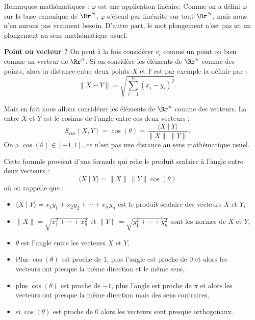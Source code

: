 \documentclass[11pt,class=report,crop=false]{standalone}
\begin{document}
Remarques mathématiques :
$\varphi$ est une application linéaire. Comme on a défini $\varphi$ sur la base canonique de $\Rr^N$, $\varphi$ s'étend par linéarité sur tout $\Rr^N$, mais nous n'en aurons pas vraiment besoin. D'autre part, le mot plongement n'est pas ici un plongement au sens mathématique usuel.

\medskip

\textbf{Point ou vecteur ?} 
On peut à la fois considérer $v_i$ comme un point ou bien comme un vecteur de $\Rr^n$.
Si on considère les éléments de $\Rr^n$ comme des points, alors 
la distance entre deux points $X$ et $Y$ est par exemple la  définie par :
$$\| X-Y \| = \sqrt{\sum_{i=1}^n (x_i - y_i)^2}.$$


Mais en fait nous allons considérer les éléments de $\Rr^n$ comme des vecteurs.
La  entre $X$ et $Y$ est le cosinus de l'angle entre ces deux vecteurs :
$$S_{\cos}(X,Y) = \cos(\theta) = \frac{\langle X \mid Y \rangle}{\| X \| \; \| Y\| }.$$
On a $\cos (\theta) \in [-1,1]$, ce n'est pas une distance au sens mathématique usuel.

Cette formule provient d'une formule qui relie le produit scalaire à l'angle entre deux vecteurs :
$$\langle X \mid Y \rangle  = \| X \| \ \| Y \| \cos(\theta)$$
où on rappelle que :
\begin{itemize}
	\item $\langle X \mid Y \rangle  = x_1y_1+x_2y_2+\cdots +x_ny_n$ est le produit scalaire des vecteurs $X$ et $Y$,
	\item $\| X \| = \sqrt{x_1^2+\cdots+x_n^2}$ et $\| Y \| = \sqrt{y_1^2+\cdots+y_n^2}$ sont les normes de $X$ et $Y$,
	\item $\theta$ est l'angle entre les vecteurs $X$ et $Y$.
\end{itemize}

\begin{itemize}
	\item Plus $\cos(\theta)$ est proche de $1$, plus l'angle est proche de $0$ et alors  les vecteurs ont presque la même direction et le même sens,
	\item plus $\cos(\theta)$ est proche de $-1$, plus l'angle est proche de $\pi$ et alors les vecteurs ont presque la même direction mais des sens contraires,
	\item si $\cos(\theta)$ est proche de $0$ alors les vecteurs sont presque orthogonaux.
\end{itemize}
\end{document}
